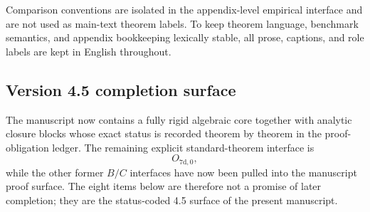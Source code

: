 Comparison conventions are isolated in the appendix-level empirical interface and are not used as
main-text theorem labels. To keep theorem language, benchmark semantics, and appendix bookkeeping
lexically stable, all prose, captions, and role labels are kept in English throughout.

\subsection{Version 4.5 completion surface}

The manuscript now contains a fully rigid algebraic core together with analytic closure blocks
whose exact status is recorded theorem by theorem in the proof-obligation ledger. The remaining
explicit standard-theorem interface is
\[
O_{7\mathrm{d,0}},
\]
while the other former $B/C$ interfaces have now been pulled into the manuscript proof surface. The
eight items below are therefore not a promise of later completion; they are the status-coded 4.5
surface of the present manuscript.

